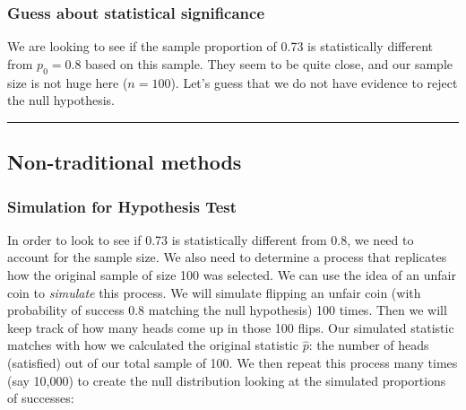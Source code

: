 \documentclass[]{tufte-book}
\newenvironment{Shaded}{\begin{snugshade}}{\end{snugshade}}
\newcommand{\KeywordTok}[1]{\textcolor[rgb]{0.13,0.29,0.53}{\textbf{{#1}}}}
\newcommand{\DataTypeTok}[1]{\textcolor[rgb]{0.13,0.29,0.53}{{#1}}}
\newcommand{\DecValTok}[1]{\textcolor[rgb]{0.00,0.00,0.81}{{#1}}}
\newcommand{\FloatTok}[1]{\textcolor[rgb]{0.00,0.00,0.81}{{#1}}}
\newcommand{\StringTok}[1]{\textcolor[rgb]{0.31,0.60,0.02}{{#1}}}
\newcommand{\NormalTok}[1]{{#1}}
\let\oldrule=\rule
\renewcommand{\rule}[1]{\oldrule{\linewidth}}
\begin{document}
\subsubsection{Guess about statistical
significance}\label{guess-about-statistical-significance-1}

We are looking to see if the sample proportion of 0.73 is statistically
different from \(p_0 = 0.8\) based on this sample. They seem to be quite
close, and our sample size is not huge here (\(n = 100\)). Let's guess
that we do not have evidence to reject the null hypothesis.

\begin{center}\rule{0.5\linewidth}{\linethickness}\end{center}

\subsection{Non-traditional methods}\label{non-traditional-methods-1}

\subsubsection{Simulation for Hypothesis
Test}\label{simulation-for-hypothesis-test}

In order to look to see if 0.73 is statistically different from 0.8, we
need to account for the sample size. We also need to determine a process
that replicates how the original sample of size 100 was selected. We can
use the idea of an unfair coin to \emph{simulate} this process. We will
simulate flipping an unfair coin (with probability of success 0.8
matching the null hypothesis) 100 times. Then we will keep track of how
many heads come up in those 100 flips. Our simulated statistic matches
with how we calculated the original statistic \(\hat{p}\): the number of
heads (satisfied) out of our total sample of 100. We then repeat this
process many times (say 10,000) to create the null distribution looking
at the simulated proportions of successes:

\begin{Shaded}
\end{Shaded}
\end{document}
